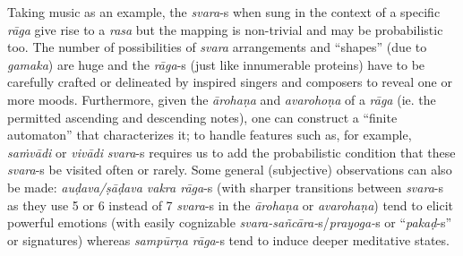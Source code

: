 Taking music as an example, the \textsl{svara}-s when sung in the context of a specific \textsl{rāga} give rise to a \textsl{rasa} but the mapping is non-trivial and may be probabilistic too. The number of possibilities of \textsl{svara} arrangements and “shapes” (due to \textsl{gamaka}) are huge and the \hbox{\textsl{rāga}-s} (just like innumerable proteins) have to be carefully crafted or delineated by inspired singers and composers to reveal one or more moods. Furthermore, given the \textsl{ārohaṇa} and \textsl{avarohoṇa} of a \textsl{rāga} (ie. the permitted ascending and descending notes), one can construct a “finite automaton” that characterizes it; to handle features such as, for example, \textsl{saṁvādi} or \textsl{vivādi} \textsl{svara}-s requires us to add the probabilistic condition that these \textsl{svara}-s be visited often or rarely. Some general (subjective) observations can also be made: \textsl{auḍava/ṣāḍava vakra rāga}-s (with sharper transitions between \textsl{svara}-s as they use 5 or 6 instead of 7 \textsl{svara}-s in the \textsl{ārohaṇa} or \textsl{avarohaṇa}) tend to elicit powerful emotions (with easily cognizable \textsl{svara-sañcāra-}s/\textsl{prayoga-}s or \hbox{“\textsl{pakaḍ}-s”} or signatures) whereas \textsl{sampūrṇa rāga}-s tend to induce deeper meditative states.

